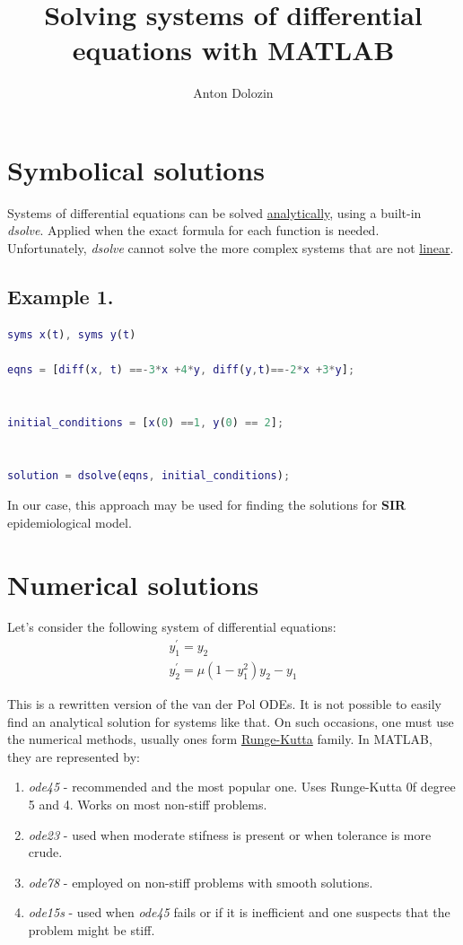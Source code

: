 \documentclass[10pt]{report}
\title{\bf{Solving systems of differential equations with MATLAB}}
\author{Anton Dolozin}
\date{}
\begin{document}
\pagestyle{empty}
\maketitle
\newpage
\section*{Symbolical solutions}
\bigskip
Systems of differential equations can be solved {\underline{analytically}}, using a built-in  {\emph{dsolve}}. Applied when the exact formula for each  function is needed. Unfortunately,  {\emph{dsolve}} cannot solve the more complex systems that are not {\underline{linear}}.
\bigskip
\subsection*{Example 1.}
\begin{lstlisting}[language=Matlab, caption={An example of system with analytic solution}]
%Symbolically defning functions
syms x(t), syms y(t)

eqns = [diff(x, t) ==-3*x +4*y, diff(y,t)==-2*x +3*y];


initial_conditions = [x(0) ==1, y(0) == 2];


solution = dsolve(eqns, initial_conditions);

\end{lstlisting}
\medskip
In our case, this approach may be used for finding the solutions for {\bf{SIR}} epidemiological model.
\bigskip
\bigskip
\bigskip

\section*{Numerical solutions}
\bigskip
Let's consider the following system of differential equations:
 \begin{eqnarray}
 y^\prime_1 =y_2 \nonumber \\
 y^\prime_2 =\mu(1-y^2_1)y_2 - y_1 \nonumber
 \end{eqnarray}
 
This is a rewritten version of the van der Pol ODEs. It is not possible to easily find an analytical solution for systems like that. On such occasions, one must use the numerical methods, usually ones form {\underline{Runge-Kutta}} family. In MATLAB, they are represented by: \begin{enumerate}
	\item {\emph{ode45}} -  recommended and the most popular one.  Uses Runge-Kutta 0f degree 5 and 4. Works on most non-stiff problems.
	\item {\emph{ode23}} - used when moderate stifness is present or when tolerance is more crude.
	\item  {\emph{ode78}} - employed on non-stiff problems with smooth solutions.
	\item {\emph{ode15s}} - used when {\emph{ode45}} fails or if  it is inefficient and one suspects that the problem might be stiff.
\end{enumerate}
\end{document}
